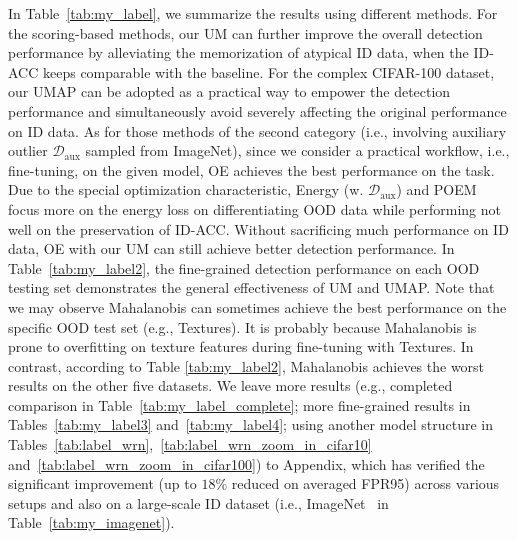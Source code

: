 \documentclass{article}
\theoremstyle{plain}
\theoremstyle{definition}
\theoremstyle{remark}
\begin{document}
In Table~\ref{tab:my_label}, we summarize the results using different methods. For the scoring-based methods, our UM can further improve the overall detection performance by alleviating the memorization of atypical ID data, when the ID-ACC keeps comparable with the baseline. For the complex CIFAR-100 dataset, our UMAP can be adopted as a practical way to empower the detection performance and simultaneously avoid severely affecting the original performance on ID data. As for those methods of the second category (i.e., involving auxiliary outlier $\mathcal{D}_\text{aux}$ sampled from ImageNet), since we consider a practical workflow, i.e., fine-tuning, on the given model, OE achieves the best performance on the task. Due to the special optimization characteristic, Energy (w. $\mathcal{D}_\text{aux}$) and POEM focus more on the energy loss on differentiating OOD data while performing not well on the preservation of ID-ACC. Without sacrificing much performance on ID data, OE with our UM can still achieve better detection performance. In Table~\ref{tab:my_label2}, the fine-grained detection performance on each OOD testing set demonstrates the general effectiveness of UM and UMAP. Note that we may observe Mahalanobis can sometimes achieve the best performance on the specific OOD test set (e.g., Textures). It is probably because Mahalanobis is prone to overfitting on texture features during fine-tuning with Textures. In contrast, according to Table \ref{tab:my_label2}, Mahalanobis achieves the worst results on the other five datasets. We leave more results (e.g., completed comparison in Table~\ref{tab:my_label_complete}; more fine-grained results in Tables~\ref{tab:my_label3} and~\ref{tab:my_label4}; using another model structure in Tables~\ref{tab:label_wrn},~\ref{tab:label_wrn_zoom_in_cifar10} and~\ref{tab:label_wrn_zoom_in_cifar100}) to Appendix, which has verified the significant improvement (up to $18\%$ reduced on averaged FPR95) across various setups and also on a large-scale ID dataset (i.e., ImageNet~\citep{deng2009imagenet} in Table~\ref{tab:my_imagenet}).
\end{document}
